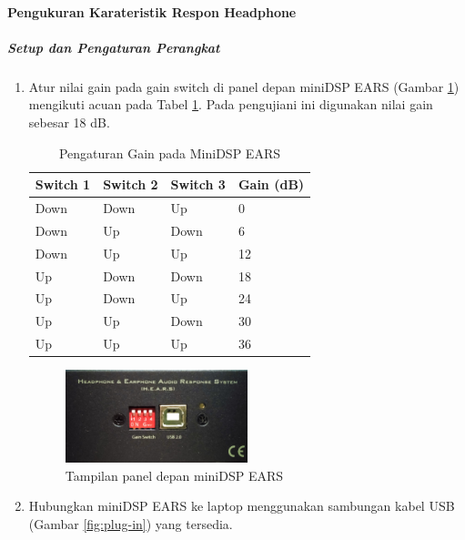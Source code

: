 \documentclass{article}
\begin{document}
	\paragraph{Pengukuran Karateristik Respon Headphone}
	\subparagraph{Setup dan Pengaturan Perangkat}
	\label{setup}
	\begin{enumerate}
		\item Atur nilai gain pada gain switch di panel depan miniDSP EARS (Gambar \ref{fig:front-panel}) mengikuti acuan pada Tabel \ref{table:gain}. Pada pengujiani ini digunakan nilai gain sebesar 18 dB.
		
		\begin{table}[H]
			\centering
			\caption{Pengaturan Gain pada MiniDSP EARS \label{table:gain}}
			\begin{tabular}{| p{0.1\textwidth} | p{} | p{} | p{} |}
				\hline
				Switch 1 & Switch 2 & Switch 3 & Gain (dB) \\ \hline\hline
				Down & Down & Up & 0 \\ \hline
				Down & Up & Down & 6 \\ \hline
				Down & Up & Up & 12 \\ \hline
				Up & Down & Down & 18 \\ \hline
				Up & Down & Up & 24 \\ \hline
				Up & Up & Down & 30 \\ \hline
				Up & Up & Up & 36 \\ \hline
			\end{tabular}
		\end{table}
		
		\begin{figure}[H]
			\centering
			\includegraphics[width=0.5\textwidth]{images/front-panel}
			\caption{Tampilan panel depan miniDSP EARS}
			\label{fig:front-panel}
		\end{figure}
		
		\item Hubungkan miniDSP EARS ke laptop menggunakan sambungan kabel USB (Gambar \ref{fig:plug-in}) yang tersedia.
		

\end{enumerate}
\end{document}
